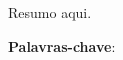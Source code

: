 
\begin{resumo}
    Resumo aqui.
    
    \vspace{\onelineskip}
    \noindent    
    \textbf{Palavras-chave}: \palavraschave
\end{resumo}

%     


